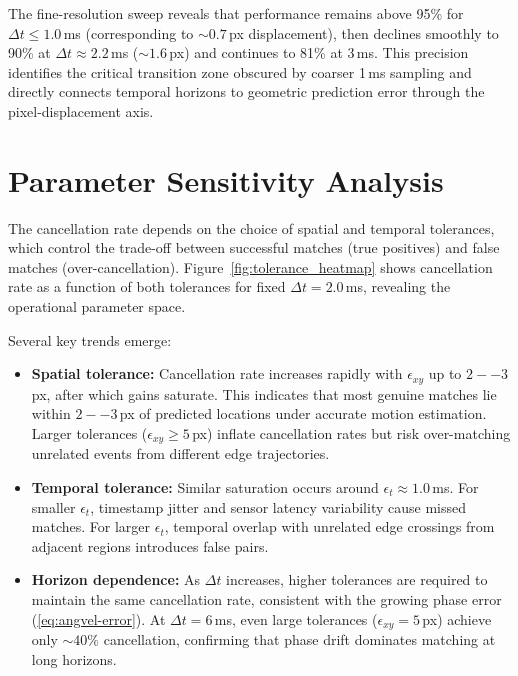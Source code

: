 The fine-resolution sweep reveals that performance remains above 95\% for $\Delta t \leq 1.0$\,ms (corresponding to $\sim 0.7$\,px displacement), then declines smoothly to 90\% at $\Delta t \approx 2.2$\,ms ($\sim 1.6$\,px) and continues to 81\% at 3\,ms. This precision identifies the critical transition zone obscured by coarser 1\,ms sampling and directly connects temporal horizons to geometric prediction error through the pixel-displacement axis.

\section{Parameter Sensitivity Analysis}

The cancellation rate depends on the choice of spatial and temporal tolerances, which control the trade-off between successful matches (true positives) and false matches (over-cancellation). Figure~\ref{fig:tolerance_heatmap} shows cancellation rate as a function of both tolerances for fixed $\Delta t=2.0$\,ms, revealing the operational parameter space.


Several key trends emerge:

\begin{itemize}
\item \textbf{Spatial tolerance:} Cancellation rate increases rapidly with $\epsilon_{xy}$ up to $2--3$\,px, after which gains saturate. This indicates that most genuine matches lie within $2--3$\,px of predicted locations under accurate motion estimation. Larger tolerances ($\epsilon_{xy} \geq 5$\,px) inflate cancellation rates but risk over-matching unrelated events from different edge trajectories.
\item \textbf{Temporal tolerance:} Similar saturation occurs around $\epsilon_t \approx 1.0$\,ms. For smaller $\epsilon_t$, timestamp jitter and sensor latency variability cause missed matches. For larger $\epsilon_t$, temporal overlap with unrelated edge crossings from adjacent regions introduces false pairs.
\item \textbf{Horizon dependence:} As $\Delta t$ increases, higher tolerances are required to maintain the same cancellation rate, consistent with the growing phase error (\eqref{eq:angvel-error}). At $\Delta t=6$\,ms, even large tolerances ($\epsilon_{xy}=5$\,px) achieve only $\sim 40\%$ cancellation, confirming that phase drift dominates matching at long horizons.
\end{itemize}

